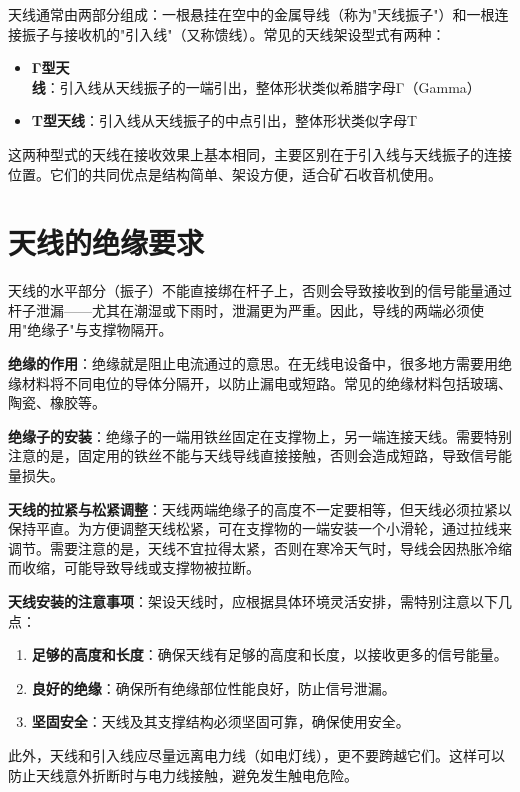 \documentclass[12pt,UTF8]{ctexbook}
\begin{document}
天线通常由两部分组成：一根悬挂在空中的金属导线（称为"天线振子"）和一根连接振子与接收机的"引入线"（又称馈线）。常见的天线架设型式有两种：

\begin{itemize}
	\item \textbf{Γ型天线}：引入线从天线振子的一端引出，整体形状类似希腊字母Γ（Gamma）
	\item \textbf{T型天线}：引入线从天线振子的中点引出，整体形状类似字母T
\end{itemize}

这两种型式的天线在接收效果上基本相同，主要区别在于引入线与天线振子的连接位置。它们的共同优点是结构简单、架设方便，适合矿石收音机使用。

\section{天线的绝缘要求}

天线的水平部分（振子）不能直接绑在杆子上，否则会导致接收到的信号能量通过杆子泄漏——尤其在潮湿或下雨时，泄漏更为严重。因此，导线的两端必须使用"绝缘子"与支撑物隔开。

\textbf{绝缘的作用}：绝缘就是阻止电流通过的意思。在无线电设备中，很多地方需要用绝缘材料将不同电位的导体分隔开，以防止漏电或短路。常见的绝缘材料包括玻璃、陶瓷、橡胶等。

\textbf{绝缘子的安装}：绝缘子的一端用铁丝固定在支撑物上，另一端连接天线。需要特别注意的是，固定用的铁丝不能与天线导线直接接触，否则会造成短路，导致信号能量损失。

\textbf{天线的拉紧与松紧调整}：天线两端绝缘子的高度不一定要相等，但天线必须拉紧以保持平直。为方便调整天线松紧，可在支撑物的一端安装一个小滑轮，通过拉线来调节。需要注意的是，天线不宜拉得太紧，否则在寒冷天气时，导线会因热胀冷缩而收缩，可能导致导线或支撑物被拉断。

\textbf{天线安装的注意事项}：架设天线时，应根据具体环境灵活安排，需特别注意以下几点：

\begin{enumerate}
	\item \textbf{足够的高度和长度}：确保天线有足够的高度和长度，以接收更多的信号能量。
	\item \textbf{良好的绝缘}：确保所有绝缘部位性能良好，防止信号泄漏。
	\item \textbf{坚固安全}：天线及其支撑结构必须坚固可靠，确保使用安全。
\end{enumerate}

此外，天线和引入线应尽量远离电力线（如电灯线），更不要跨越它们。这样可以防止天线意外折断时与电力线接触，避免发生触电危险。
\end{document}
